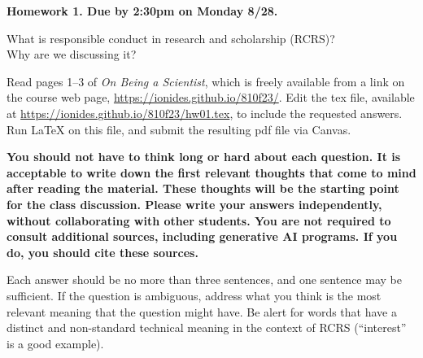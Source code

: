\documentclass[12pt]{article}
\begin{document}
\begin{center}\bf 
Homework 1. Due by 2:30pm on Monday 8/28. 

What is responsible conduct in research and scholarship (RCRS)? \\
Why are we discussing it? 
\end{center}

Read pages 1--3 of {\em On Being a Scientist}, which is freely available from a link on the course web page, \url{https://ionides.github.io/810f23/}. Edit the tex file, available at \url{https://ionides.github.io/810f23/hw01.tex}, to include the requested answers. Run {\LaTeX} on this file, and submit the resulting pdf file via Canvas.

{\bf You should not have to think long or hard about each question. It is acceptable to write down the first relevant thoughts that come to mind after reading the material. These thoughts will be the starting point for the class discussion. Please write your answers independently, without collaborating with other students. You are not required to consult additional sources, including generative AI programs. If you do, you should cite these sources.

Each answer should be no more than three sentences, and one sentence may be sufficient. If the question is ambiguous, address what you think is the most relevant meaning that the question might have. Be alert for words that have a distinct and non-standard technical meaning in the context of RCRS (``interest'' is a good example).

}
\end{document}
